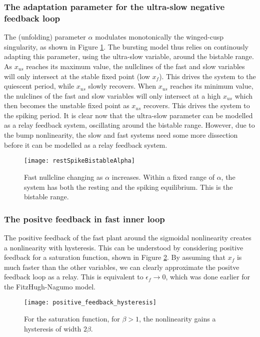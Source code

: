 \documentclass[a4paper, 12pt]{article}
\begin{document}
\subsubsection{The adaptation parameter for the ultra-slow negative feedback loop }
The (unfolding) parameter $\alpha$ modulates monotonically the winged-cusp singularity\cite{franci}, as shown in Figure \ref{fig:alphaParameter}. The bursting model thus relies on continously adapting this parameter, using the ultra-slow variable, around the bistable range. As $x_{us}$ reaches its maximum value, the nullclines of the fast and slow variables will only intersect at the stable fixed point (low $x_f$). This drives the system to the quiescent period, while $x_{us}$ slowly recovers. When $x_{us}$ reaches its minimum value, the nulclines of the fast and slow variables will only intersect at a high $x_{us}$ which then becomes the unstable fixed point as $x_{us}$ recovers. This drives the system to the spiking period. 
It is clear now that the ultra-slow parameter can be modelled as a relay feedback system, oscillating around the bistable range. However, due to the bump nonlinearity, the slow and fast systems need some more dissection before it can be modelled as a relay feedback system.



\begin{figure}
\texttt{[image: restSpikeBistableAlpha]}
\caption{Fast nullcline changing as $\alpha$ increases. Within a fixed range of $\alpha$, the system has both the resting and the spiking equilibrium. This is the bistable range.}
\label{fig:alphaParameter}
\end{figure}
\FloatBarrier
\subsubsection{The positve feedback in fast inner loop}
The positive feedback of the fast plant around the sigmoidal nonlinearity creates a nonlinearity with hysteresis. This can be understood by considering positive feedback for a saturation function, shown in Figure \ref{fig:positive_feedback_hysteresis}. By assuming that $x_f$ is much faster than the other variables, we can clearly approximate the positve feedback loop as a relay. This is equivalent to $\epsilon_f\rightarrow 0$, which was done earlier for the FitzHugh-Nagumo model. 

\begin{figure}
\texttt{[image: positive\_feedback\_hysteresis]}
\caption{For the saturation function, for $\beta > 1$, the nonlinearity gains a hysteresis of width $2\beta$. }
\label{fig:positive_feedback_hysteresis}
\end{figure}
\end{document}
